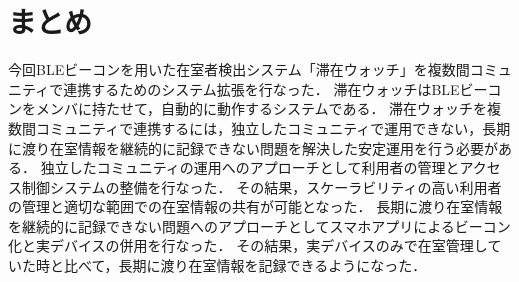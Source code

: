 



\section{まとめ}

今回BLEビーコンを用いた在室者検出システム「滞在ウォッチ」を複数間コミュニティで連携するためのシステム拡張を行なった．
滞在ウォッチはBLEビーコンをメンバに持たせて，自動的に動作するシステムである．
滞在ウォッチを複数間コミュニティで連携するには，独立したコミュニティで運用できない，長期に渡り在室情報を継続的に記録できない問題を解決した安定運用を行う必要がある．
独立したコミュニティの運用へのアプローチとして利用者の管理とアクセス制御システムの整備を行なった．
その結果，スケーラビリティの高い利用者の管理と適切な範囲での在室情報の共有が可能となった．
長期に渡り在室情報を継続的に記録できない問題へのアプローチとしてスマホアプリによるビーコン化と実デバイスの併用を行なった．
その結果，実デバイスのみで在室管理していた時と比べて，長期に渡り在室情報を記録できるようになった．